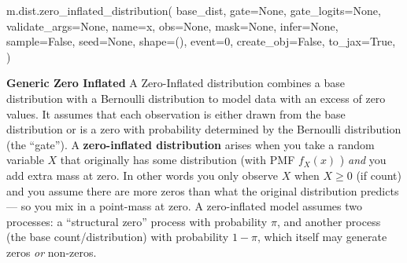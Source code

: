 \documentclass[
  letterpaper,
  DIV=11,
  numbers=noendperiod]{scrartcl}
\newenvironment{Shaded}{\begin{snugshade}}{\end{snugshade}}
\newcommand{\DecValTok}[1]{\textcolor[rgb]{0.68,0.00,0.00}{#1}}
\newcommand{\NormalTok}[1]{\textcolor[rgb]{0.00,0.23,0.31}{#1}}
\newcommand{\OperatorTok}[1]{\textcolor[rgb]{0.37,0.37,0.37}{#1}}
\newcommand{\StringTok}[1]{\textcolor[rgb]{0.13,0.47,0.30}{#1}}
\newcommand{\VariableTok}[1]{\textcolor[rgb]{0.07,0.07,0.07}{#1}}
\begin{document}
\begin{Shaded}
\begin{Highlighting}[]
\NormalTok{m.dist.zero\_inflated\_distribution(}
\NormalTok{    base\_dist,}
\NormalTok{    gate}\OperatorTok{=}\VariableTok{None}\NormalTok{,}
\NormalTok{    gate\_logits}\OperatorTok{=}\VariableTok{None}\NormalTok{,}
\NormalTok{    validate\_args}\OperatorTok{=}\VariableTok{None}\NormalTok{,}
\NormalTok{    name}\OperatorTok{=}\StringTok{\textquotesingle{}x\textquotesingle{}}\NormalTok{,}
\NormalTok{    obs}\OperatorTok{=}\VariableTok{None}\NormalTok{,}
\NormalTok{    mask}\OperatorTok{=}\VariableTok{None}\NormalTok{,}
\NormalTok{    infer}\OperatorTok{=}\VariableTok{None}\NormalTok{,}
\NormalTok{    sample}\OperatorTok{=}\VariableTok{False}\NormalTok{,}
\NormalTok{    seed}\OperatorTok{=}\VariableTok{None}\NormalTok{,}
\NormalTok{    shape}\OperatorTok{=}\NormalTok{(),}
\NormalTok{    event}\OperatorTok{=}\DecValTok{0}\NormalTok{,}
\NormalTok{    create\_obj}\OperatorTok{=}\VariableTok{False}\NormalTok{,}
\NormalTok{    to\_jax}\OperatorTok{=}\VariableTok{True}\NormalTok{,}
\NormalTok{)}
\end{Highlighting}
\end{Shaded}

\textbf{Generic Zero Inflated} A Zero-Inflated distribution combines a
base distribution with a Bernoulli distribution to model data with an
excess of zero values. It assumes that each observation is either drawn
from the base distribution or is a zero with probability determined by
the Bernoulli distribution (the ``gate''). A \textbf{zero-inflated
distribution} arises when you take a random variable \(X\) that
originally has some distribution (with PMF \(f_X(x)\) ) \emph{and} you
add extra mass at zero. In other words you only observe \(X\) when
\(X \ge 0\) (if count) and you assume there are more zeros than what the
original distribution predicts --- so you mix in a point-mass at zero. A
zero-inflated model assumes two processes: a ``structural zero'' process
with probability \(\pi\), and another process (the base
count/distribution) with probability \(1 - \pi\), which itself may
generate zeros \emph{or} non-zeros.
\end{document}
